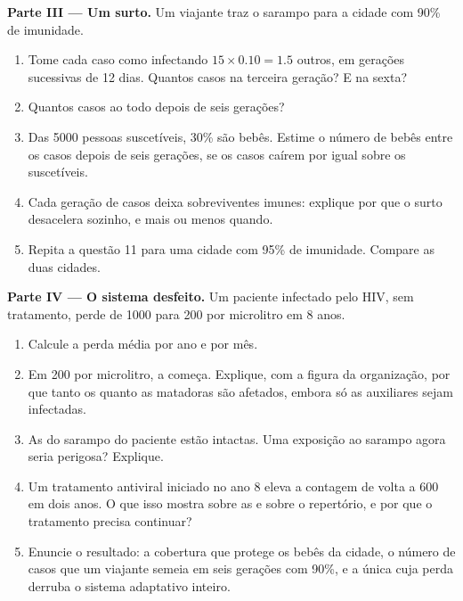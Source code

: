\begin{problem}
\medskip
\noindent\textbf{Parte III --- Um surto.}
Um viajante traz o sarampo para a cidade com 90\% de imunidade.
\begin{enumerate}[resume]
  \item Tome cada caso como infectando $15 \times 0.10 = 1.5$ outros,
        em gerações sucessivas de 12 dias. Quantos casos na terceira
        geração? E na sexta?
  \item Quantos casos ao todo depois de seis gerações?
  \item Das 5000 pessoas suscetíveis, 30\% são bebês. Estime o número
        de bebês entre os casos depois de seis gerações, se os casos
        caírem por igual sobre os suscetíveis.
  \item Cada geração de casos deixa sobreviventes imunes: explique por
        que o surto desacelera sozinho, e mais ou menos quando.
  \item Repita a questão 11 para uma cidade com 95\% de imunidade.
        Compare as duas cidades.
\end{enumerate}

\medskip
\noindent\textbf{Parte IV --- O sistema desfeito.}
Um paciente infectado pelo HIV, sem tratamento, perde  de 1000 para 200 por microlitro em 8 anos.
\begin{enumerate}[resume]
  \item Calcule a perda média por ano e por mês.
  \item Em 200 por microlitro, a  começa. Explique, com a figura da
        organização, por que tanto os  quanto as 
        matadoras são afetados, embora só as  auxiliares sejam
        infectadas.
  \item As  do sarampo do paciente estão intactas.
        Uma exposição ao sarampo agora seria perigosa? Explique.
  \item Um tratamento antiviral iniciado no ano 8 eleva a contagem de
        volta a 600 em dois anos. O que isso mostra sobre as  e sobre o repertório, e por que o tratamento precisa continuar?
  \item Enuncie o resultado: a cobertura que protege os bebês da
        cidade, o número de casos que um viajante semeia em seis
        gerações com 90\%, e a única  cuja perda derruba o
        sistema adaptativo inteiro.
\end{enumerate}
\end{problem}
